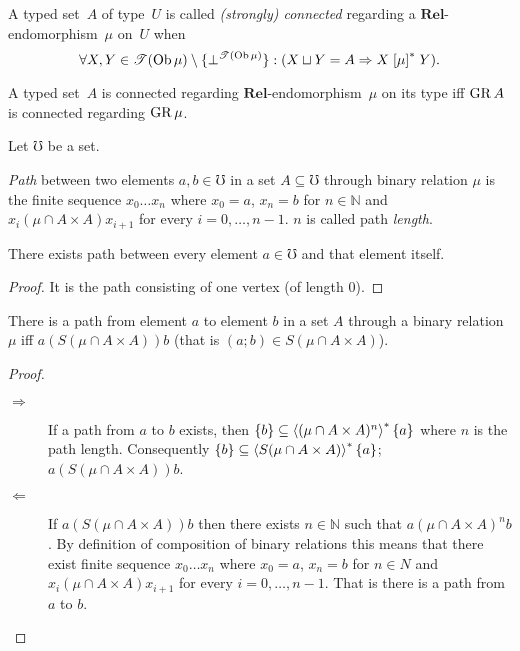 \begin{defn}
A typed set~$A$ of type~$U$ is called \emph{(strongly) connected}
regarding a $\mathbf{Rel}$-endomorphism~$\mu$ on~$U$ when
\[
\forall X,Y\in\mathscr{T}(\operatorname{Ob}\mu)\setminus\{\bot^{\mathscr{T}(\operatorname{Ob}\mu)}\}:(X\sqcup Y=A\Rightarrow X\mathrel{\left[\mu\right]^{\ast}}Y).
\]
\end{defn}
\begin{obvious}
A typed set~$A$ is connected regarding $\mathbf{Rel}$-endomorphism~$\mu$
on its type iff $\operatorname{GR} A$ is connected regarding $\operatorname{GR}\mu$.
\end{obvious}
Let $\mho$ be a set.
\begin{defn}
\emph{Path} between two elements $a,b\in\mho$ in a set
$A\subseteq\mho$ through binary relation $\mu$ is the finite sequence
$x_{0}\ldots x_{n}$ where $x_{0}=a$, $x_{n}=b$ for $n\in\mathbb{N}$
and $x_{i}\mathrel{(\mu\cap A\times A)}x_{i+1}$ for every $i=0,\ldots,n-1$.
$n$ is called path \emph{length}.\end{defn}
\begin{prop}
There exists path between every element $a\in\mho$ and that element
itself.\end{prop}
\begin{proof}
It is the path consisting of one vertex (of length $0$).\end{proof}
\begin{prop}
There is a path from element $a$ to element $b$ in a set $A$ through
a binary relation $\mu$ iff $a\mathrel{(S(\mu\cap A\times A))}b$
(that is $(a;b)\in S(\mu\cap A\times A)$).\end{prop}
\begin{proof}
~
\begin{description}
\item [{$\Rightarrow$}] If a path from $a$ to $b$ exists, then $\{b\}\subseteq\left\langle (\mu\cap A\times A)^{n}\right\rangle ^{\ast}\{a\}$
where $n$ is the path length. Consequently $\{b\}\subseteq\left\langle S(\mu\cap A\times A)\right\rangle ^{\ast}\{a\}$;
$a\mathrel{(S(\mu\cap A\times A))}b$.
\item [{$\Leftarrow$}] If $a\mathrel{(S(\mu\cap A\times A))}b$ then there
exists $n\in\mathbb{N}$ such that $a\mathrel{(\mu\cap A\times A)^{n}}b$.
By definition of composition of binary relations this means that there
exist finite sequence $x_{0}\ldots x_{n}$ where $x_{0}=a$, $x_{n}=b$
for $n\in\mathbb{}{N}$ and $x_{i}\mathrel{(\mu\cap A\times A)}x_{i+1}$
for every $i=0,\ldots,n-1$. That is there is a path from $a$ to
$b$.
\end{description}
\end{proof}
